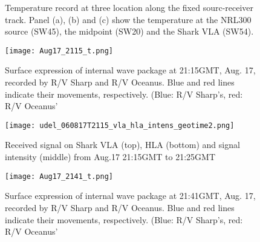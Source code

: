 \begin{figure}[!ht]
    \caption{Temperature record at three location along the fixed sourc-receiver track. Panel (a), (b) and (c) show the temperature at the NRL300 source (SW45), the midpoint (SW20) and the Shark VLA (SW54).}
    \label{fig:j15_temp}
\end{figure}
\begin{figure}[H]
  \centering
  \texttt{[image: Aug17\_2115\_t.png]}
  \caption{Surface expression of internal wave package at 21:15GMT, Aug. 17, recorded by R/V Sharp and R/V Oceanus. Blue and red lines indicate their movements, respectively. (Blue: R/V Sharp's, red: R/V Oceanus'}\label{fig:r2115_r}
\end{figure}


\begin{figure}[H]
  \centering
  \texttt{[image: udel\_060817T2115\_vla\_hla\_intens\_geotime2.png]}
  \caption{Received signal on Shark VLA (top), HLA (bottom) and signal intensity (middle) from Aug.17 21:15GMT to 21:25GMT }\label{fig:a2115}
\end{figure}



\begin{figure}[H]
  \centering
  \texttt{[image: Aug17\_2141\_t.png]}
  \caption{Surface expression of internal wave package at 21:41GMT, Aug. 17, recorded by R/V Sharp and R/V Oceanus. Blue and red lines indicate their movements, respectively. (Blue: R/V Sharp's, red: R/V Oceanus'}\label{fig:r2141_r}
\end{figure}

